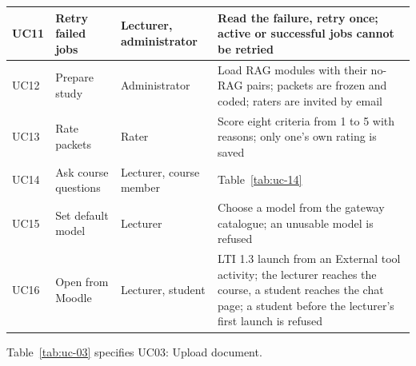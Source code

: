 \begin{longtable}{|p{1.2cm}|p{3.6cm}|p{2.9cm}|p{6.9cm}|}
UC11 & Retry failed jobs & Lecturer, administrator & Read the failure, retry once; active or successful jobs cannot be retried\\\hline
UC12 & Prepare study & Administrator & Load RAG modules with their no-RAG pairs; packets are frozen and coded; raters are invited by email\\\hline
UC13 & Rate packets & Rater & Score eight criteria from 1 to 5 with reasons; only one's own rating is saved\\\hline
UC14 & Ask course questions & Lecturer, course member & Table~\ref{tab:uc-14}\\\hline
UC15 & Set default model & Lecturer & Choose a model from the gateway catalogue; an unusable model is refused\\\hline
UC16 & Open from Moodle & Lecturer, student & LTI 1.3 launch from an External tool activity; the lecturer reaches the course, a student reaches the chat page; a student before the lecturer's first launch is refused\\\hline
\end{longtable}
\needspace{.39\textheight}
Table~\ref{tab:uc-03} specifies UC03: Upload document.
